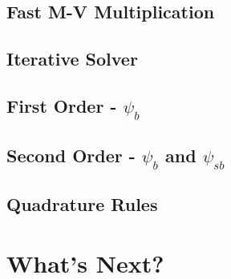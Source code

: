 \documentclass [10pt,letterpaper]{article}
\begin{document}
\subsection{Fast M-V Multiplication}
\label{sub:fast-M-V-multiplication}
\subsection{Iterative Solver}
\label{sub:iterative-solver}
\subsection{First Order - $\psi_b$}
\label{sub:first-order-psib}
\subsection{Second Order - $\psi_b$ and $\psi_{sb}$}
\label{sub:second-order-psib-and-psisb} 
\subsection{Quadrature Rules}
\label{sub:quadrature-rules}
\section{What's Next?}
\label{sec:whats-next}
\end{document}
